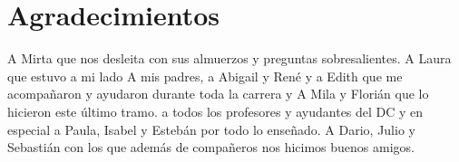\chapter*{Agradecimientos}

\noindent A Mirta que nos desleita con sus almuerzos y preguntas sobresalientes.
\noindent A Laura que estuvo a mi lado
\noindent A mis padres, a Abigail y René y a Edith que me acompañaron y ayudaron durante toda la carrera y A Mila y Florián que lo hicieron este último tramo. 
\noindent a todos los profesores y ayudantes del DC y en especial a Paula, Isabel y Estebán por todo lo enseñado.
\noindent A Dario, Julio y Sebastián con los que además de compañeros nos hicimos buenos amigos.
